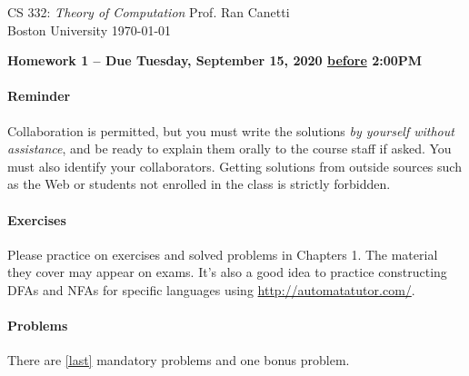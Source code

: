 \documentclass[letterpaper,11pt]{article}
\begin{document}
{\noindent\large
CS 332: {\em Theory of Computation} \hfill Prof. Ran Canetti\\
Boston University \hfill \today\\}
\vspace{1pt} \hrulefill\vspace{3mm}
\begin{center}
{\Large\bf Homework 1 -- Due Tuesday, September 15, 2020 \underline{before} 2:00PM}
\end{center}

\paragraph{Reminder}
Collaboration is permitted, but you must write the solutions {\em by
yourself without assistance}, and be ready to explain them orally to
the course staff if asked. You must also identify your
collaborators. Getting solutions from outside sources such as the
Web or students not enrolled in the class is strictly forbidden.



\paragraph{Exercises}
Please practice on exercises and solved problems in Chapters 1.
The material they cover may appear on exams. It's also a good idea to practice constructing DFAs and NFAs for specific languages using \url{http://automatatutor.com/}.

\paragraph{Problems}
There are \ref{last}
mandatory problems and one bonus problem.
\end{document}

